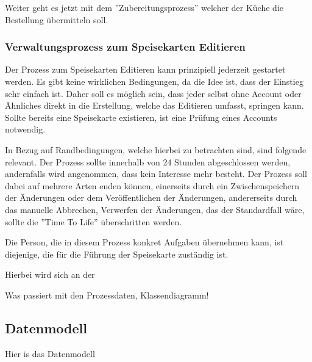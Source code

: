Weiter geht es jetzt mit dem ''Zubereitungsprozess'' welcher der Küche die Bestellung übermitteln soll. 




\subsubsection{Verwaltungsprozess zum Speisekarten Editieren}
Der Prozess zum Speisekarten Editieren kann prinzipiell jederzeit gestartet werden. Es gibt keine wirklichen Bedingungen, da die Idee ist, dass der Einstieg sehr einfach ist. Daher soll es möglich sein, dass jeder selbst ohne Account oder Ähnliches direkt in die Erstellung, welche das Editieren umfasst, springen kann. Sollte bereits eine Speisekarte existieren, ist eine Prüfung eines Accounts notwendig.

In Bezug auf Randbedingungen, welche hierbei zu betrachten sind, sind folgende relevant. Der Prozess sollte innerhalb von 24 Stunden abgeschlossen werden, andernfalls wird angenommen, dass kein Interesse mehr besteht. Der Prozess soll dabei auf mehrere Arten enden können, einerseits durch ein Zwischenspeichern der Änderungen oder dem Veröffentlichen der Änderungen, andererseits durch das manuelle Abbrechen, Verwerfen der Änderungen, das der Standardfall wäre, sollte die ''Time To Life'' überschritten werden.

Die Person, die in diesem Prozess konkret Aufgaben übernehmen kann, ist diejenige, die für die Führung der Speisekarte zuständig ist.

\clearpage
{}

Hierbei wird sich an der 


Was passiert mit den Prozessdaten,  Klassendiagramm!


\subsection{Datenmodell}
\label{sec:datenmodell}
Hier is das Datenmodell


\clearpage
{}


